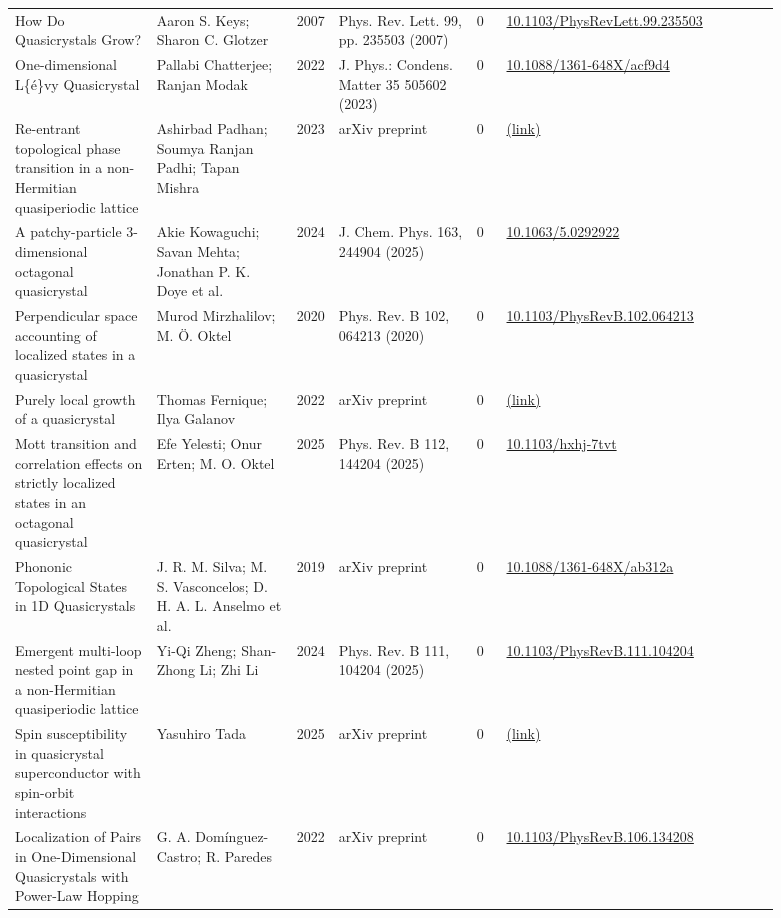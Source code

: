 \documentclass[10pt,a4paper]{article}
\begin{document}
{\begin{longtable}{p{0.192\linewidth}p{0.192\linewidth}p{0.043\linewidth}p{0.192\linewidth}p{0.043\linewidth}p{0.132\linewidth}p{0.096\linewidth}}
How Do Quasicrystals Grow? & Aaron S. Keys; Sharon C. Glotzer & 2007 & Phys. Rev. Lett. 99, pp. 235503 (2007) & 0 & \href{https://doi.org/10.1103/PhysRevLett.99.235503}{10.1103/PhysRevLett.99.235503} &  \\
One-dimensional L\{é\}vy Quasicrystal & Pallabi Chatterjee; Ranjan Modak & 2022 & J. Phys.: Condens. Matter 35 505602 (2023) & 0 & \href{https://doi.org/10.1088/1361-648X/acf9d4}{10.1088/1361-648X/acf9d4} &  \\
Re-entrant topological phase transition in a non-Hermitian quasiperiodic lattice & Ashirbad Padhan; Soumya Ranjan Padhi; Tapan Mishra & 2023 & arXiv preprint & 0 & \href{http://arxiv.org/abs/2306.11084v1}{(link)} &  \\
A patchy-particle 3-dimensional octagonal quasicrystal & Akie Kowaguchi; Savan Mehta; Jonathan P. K. Doye et al. & 2024 & J. Chem. Phys. 163, 244904 (2025) & 0 & \href{https://doi.org/10.1063/5.0292922}{10.1063/5.0292922} &  \\
Perpendicular space accounting of localized states in a quasicrystal & Murod Mirzhalilov; M. Ö. Oktel & 2020 & Phys. Rev. B 102, 064213 (2020) & 0 & \href{https://doi.org/10.1103/PhysRevB.102.064213}{10.1103/PhysRevB.102.064213} &  \\
Purely local growth of a quasicrystal & Thomas Fernique; Ilya Galanov & 2022 & arXiv preprint & 0 & \href{http://arxiv.org/abs/2201.00789v2}{(link)} &  \\
Mott transition and correlation effects on strictly localized states in an octagonal quasicrystal & Efe Yelesti; Onur Erten; M. O. Oktel & 2025 & Phys. Rev. B 112, 144204 (2025) & 0 & \href{https://doi.org/10.1103/hxhj-7tvt}{10.1103/hxhj-7tvt} &  \\
Phononic Topological States in 1D Quasicrystals & J. R. M. Silva; M. S. Vasconcelos; D. H. A. L. Anselmo et al. & 2019 & arXiv preprint & 0 & \href{https://doi.org/10.1088/1361-648X/ab312a}{10.1088/1361-648X/ab312a} &  \\
Emergent multi-loop nested point gap in a non-Hermitian quasiperiodic lattice & Yi-Qi Zheng; Shan-Zhong Li; Zhi Li & 2024 & Phys. Rev. B 111, 104204 (2025) & 0 & \href{https://doi.org/10.1103/PhysRevB.111.104204}{10.1103/PhysRevB.111.104204} &  \\
Spin susceptibility in quasicrystal superconductor with spin-orbit interactions & Yasuhiro Tada & 2025 & arXiv preprint & 0 & \href{http://arxiv.org/abs/2512.15093v1}{(link)} &  \\
Localization of Pairs in One-Dimensional Quasicrystals with Power-Law Hopping & G. A. Domínguez-Castro; R. Paredes & 2022 & arXiv preprint & 0 & \href{https://doi.org/10.1103/PhysRevB.106.134208}{10.1103/PhysRevB.106.134208} &  \\

\end{longtable}}
\end{document}
